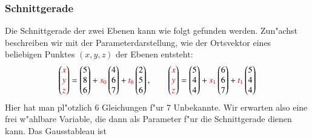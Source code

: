 \subsubsection{Schnittgerade}
Die Schnittgerade der zwei Ebenen kann wie folgt gefunden werden.
Zun"achst beschreiben wir mit der Parameterdarstellung, wie der
Ortsvektor eines beliebigen Punktes $(x,y,z)$ der Ebenen entsteht:
\[
\begin{pmatrix}
\color{red}x\\
\color{red}y\\
\color{red}z\\
\end{pmatrix}
=
\begin{pmatrix}5\\8\\6\end{pmatrix}
+{\color{red}s_0}\begin{pmatrix}4\\6\\7\end{pmatrix}
+{\color{red}t_0}\begin{pmatrix}2\\5\\6\end{pmatrix}
,\qquad
\begin{pmatrix}
\color{red}x\\
\color{red}y\\
\color{red}z\\
\end{pmatrix}
=
\begin{pmatrix}5\\4\\4\end{pmatrix}
+{\color{red}s_1}\begin{pmatrix}6\\6\\7\end{pmatrix}
+{\color{red}t_1}\begin{pmatrix}5\\4\\4\end{pmatrix}
\]
Hier hat man pl"otzlich 6 Gleichungen f"ur 7 Unbekannte.
Wir erwarten also eine frei w"ahlbare Variable, die dann als Parameter
f"ur die Schnittgerade dienen kann.
Das Gausstableau ist
